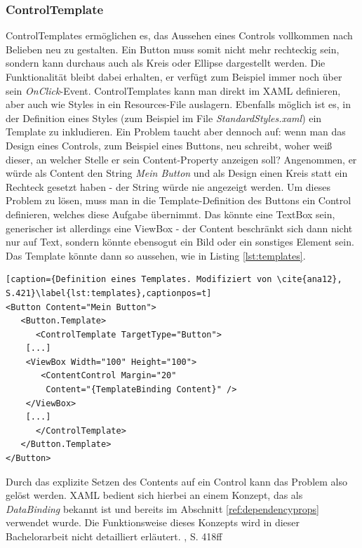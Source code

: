 \documentclass[a4paper,bibtotoc,oneside]{scrbook}
\begin{document}
\subsubsection[ControlTemplate]{ControlTemplate}\label{ref:controltemplate}
ControlTemplates ermöglichen es, das Aussehen eines Controls vollkommen nach Belieben neu zu gestalten. Ein Button muss somit nicht mehr rechteckig sein, sondern kann durchaus auch als Kreis oder Ellipse dargestellt werden. Die Funktionalität bleibt dabei erhalten, er verfügt zum Beispiel immer noch über sein \textit{OnClick}-Event.
\newline
\newline
ControlTemplates kann man direkt im XAML definieren, aber auch wie Styles in ein Resources-File auslagern. Ebenfalls möglich ist es, in der Definition eines Styles (zum Beispiel im File \textit{StandardStyles.xaml})  ein Template zu inkludieren.
\newline
\newline
Ein Problem taucht aber dennoch auf: wenn man das Design eines Controls, zum Beispiel eines Buttons, neu schreibt, woher weiß dieser, an welcher Stelle er sein Content-Property anzeigen soll? Angenommen, er würde als Content den String \textit{Mein Button} und als Design einen Kreis statt ein Rechteck gesetzt haben - der String würde nie angezeigt werden.
\newline
Um dieses Problem zu lösen, muss man in die Template-Definition des Buttons ein Control definieren, welches diese Aufgabe übernimmt. Das könnte eine TextBox sein, generischer ist allerdings eine ViewBox - der Content beschränkt sich dann nicht nur auf Text, sondern könnte ebensogut ein Bild oder ein sonstiges Element sein. Das Template könnte dann so aussehen, wie in Listing \ref{lst:templates}.
\begin{lstlisting}[caption={Definition eines Templates. Modifiziert von \cite{ana12}, S.421}\label{lst:templates},captionpos=t]
<Button Content="Mein Button">
   <Button.Template>
      <ControlTemplate TargetType="Button">
	[...]
	<ViewBox Width="100" Height="100">
	   <ContentControl Margin="20"
		Content="{TemplateBinding Content}" />
	</ViewBox>
	[...]
      </ControlTemplate>
   </Button.Template>
</Button>
\end{lstlisting}
Durch das explizite Setzen des Contents auf ein Control kann das Problem also gelöst werden. XAML bedient sich hierbei an einem Konzept, das als \textit{DataBinding} bekannt ist und bereits im Abschnitt \ref{ref:dependencyprops} verwendet wurde. Die Funktionsweise dieses Konzepts wird in dieser Bachelorarbeit nicht detailliert erläutert.
\cite{ana12}, S. 418ff
\end{document}

